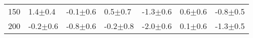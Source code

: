 \begin{tabular}{lllllll}
150 & {\cellcolor[HTML]{C4C4C4}} \color[HTML]{000000} 1.4$\pm$0.4 & {\cellcolor[HTML]{979797}} \color[HTML]{F1F1F1} -0.1$\pm$0.6 & {\cellcolor[HTML]{A2A2A2}} \color[HTML]{F1F1F1} 0.5$\pm$0.7 & {\cellcolor[HTML]{BABABA}} \color[HTML]{000000} -1.3$\pm$0.6 & {\cellcolor[HTML]{A8A8A8}} \color[HTML]{F1F1F1} 0.6$\pm$0.6 & {\cellcolor[HTML]{B2B2B2}} \color[HTML]{000000} -0.8$\pm$0.5 \\
200 & {\cellcolor[HTML]{999999}} \color[HTML]{F1F1F1} -0.2$\pm$0.6 & {\cellcolor[HTML]{ABABAB}} \color[HTML]{000000} -0.8$\pm$0.6 & {\cellcolor[HTML]{989898}} \color[HTML]{F1F1F1} -0.2$\pm$0.8 & {\cellcolor[HTML]{C5C5C5}} \color[HTML]{000000} -2.0$\pm$0.6 & {\cellcolor[HTML]{989898}} \color[HTML]{F1F1F1} 0.1$\pm$0.6 & {\cellcolor[HTML]{BBBBBB}} \color[HTML]{000000} -1.3$\pm$0.5 \\
\end{tabular}
